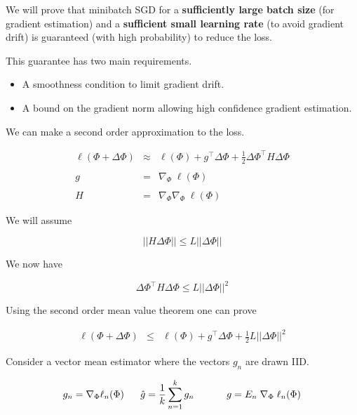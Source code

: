 {We will prove that minibatch SGD for a {\bf sufficiently large batch size} (for gradient estimation) and a {\bf sufficient small learning rate} (to avoid gradient drift)
is guaranteed (with high probability) to reduce the loss.

\vfill
This guarantee has two main requirements.

\vfill
\begin{itemize}
\item A smoothness condition to limit gradient drift.

  \vfill
\item A bound on the gradient norm allowing high confidence gradient estimation.
\end{itemize}
  


We can make a second order approximation to the loss.

\begin{eqnarray*}
  \ell(\Phi + \Delta \Phi) & \approx & \ell(\Phi) + g^\top \Delta \Phi + \frac{1}{2} \Delta \Phi^\top H \Delta \Phi \\
  \\
  g & = & \nabla_\Phi\;\ell(\Phi) \\
  \\
  H & = & \nabla_\Phi \nabla_\Phi\; \ell(\Phi)
\end{eqnarray*}



We will assume

$$||H\Delta \Phi|| \leq L||\Delta \Phi||$$

We now have

\vfill
$$\Delta \Phi^\top H \Delta \Phi \leq L ||\Delta \Phi||^2$$

\vfill
Using the second order mean value theorem one can prove

\begin{eqnarray*}
  \ell(\Phi + \Delta \Phi)  & \leq &    \ell(\Phi) + g^\top \Delta \Phi + \frac{1}{2} L ||\Delta \Phi||^2
\end{eqnarray*}



Consider a vector mean estimator where the vectors $g_n$ are drawn IID.

$$g_n = \nabla_\Phi \ell_n(\Phi) \;\;\;\;\;\;\hat{g} = \frac{1}{k} \sum_{n=1}^k g_n \;\;\;\; \;\;\;\;\;\;\;\; g = E_{n}\;\nabla_\Phi\;\ell_n(\Phi)$$

}

